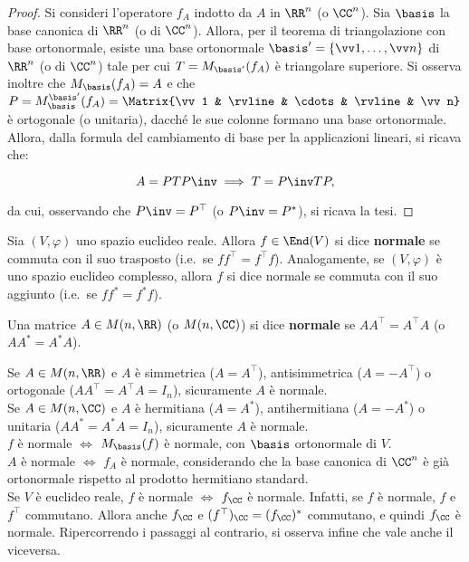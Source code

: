 \begin{proof}
	Si consideri l'operatore $f_A$ indotto da $A$ in $\RR^n$ (o $\CC^n$). Sia $\basis$ la base canonica di $\RR^n$ (o di $\CC^n$). Allora, per il teorema
	di triangolazione con base ortonormale, esiste una base ortonormale $\basis' = \{ \vv1, \ldots, \vv n \}$ di $\RR^n$ (o di $\CC^n$)
	tale per cui $T = M_{\basis'}(f_A)$ è triangolare superiore. Si osserva inoltre che $M_{\basis}(f_A) = A$ e che $P = M_{\basis}^{\basis'} (f_A) = \Matrix{\vv 1 & \rvline & \cdots & \rvline & \vv n}$ è ortogonale (o unitaria), dacché le sue colonne
	formano una base ortonormale. Allora, dalla formula del cambiamento di base per la applicazioni lineari,
	si ricava che:
	
	\[ A = P T P\inv \implies T = P\inv T P, \]
	
	da cui, osservando che $P\inv = P^\top$ (o $P\inv = P^*$), si ricava la tesi.
\end{proof}

\begin{definition} 
	Sia $(V, \varphi)$ uno spazio euclideo reale. Allora $f \in \End(V)$ si dice \textbf{normale}
	se commuta con il suo trasposto (i.e.~se $f f^\top = f^\top f$). Analogamente,
	se $(V, \varphi)$ è uno spazio euclideo complesso, allora $f$ si dice normale se commuta con il suo
	aggiunto (i.e.~se $f f^* = f^* f$).
\end{definition}

\begin{definition} 
	Una matrice $A \in M(n, \RR)$ (o $M(n, \CC)$) si dice \textbf{normale} se $A A^\top = A^\top A$ (o $A A^* = A^* A$).
\end{definition}

\begin{remark}\nl
	\li Se $A \in M(n, \RR)$ e $A$ è simmetrica ($A = A^\top$), antisimmetrica ($A = -A^\top$) o
	ortogonale ($A A^\top = A^\top A = I_n$), sicuramente $A$ è normale. \\
	\li Se $A \in M(n, \CC)$ e $A$ è hermitiana ($A = A^*$), antihermitiana ($A = -A^*$) o
	unitaria ($A A^* = A^* A = I_n$), sicuramente $A$ è normale. \\
	\li $f$ è normale $\iff$ $M_\basis(f)$ è normale, con $\basis$ ortonormale di $V$. \\
	\li $A$ è normale $\iff$ $f_A$ è normale, considerando che la base canonica di $\CC^n$ è già
	ortonormale rispetto al prodotto hermitiano standard. \\
	\li Se $V$ è euclideo reale, $f$ è normale $\iff$ $f_\CC$ è normale. Infatti, se $f$ è normale, $f$ e $f^\top$
	commutano. Allora anche $f_\CC$ e $(f^\top)_\CC = (f_\CC)^*$ commutano, e quindi $f_\CC$ è normale.
	Ripercorrendo i passaggi al contrario, si osserva infine che vale anche il viceversa.
\end{remark}

